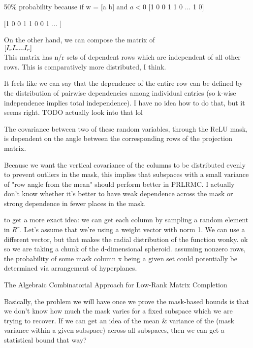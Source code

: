 \documentclass[12pt]{article}
\begin{document}
50\% probability because if w = [a b] and $a<0$
[1 0
0 1
1 0 
...
1 0]


[1 0
0 1
1 0
0 1
...
]

On the other hand, we can compose the matrix of \\$[I_r\\I_r\\...\\I_r]$\\This matrix has n/r sets of dependent rows which are independent of all other rows. This is comparatively more distributed, I think.


It feels like we can say that the dependence of the entire row can be defined by the distribution of pairwise dependencies among individual entries (so k-wise independence implies total independence). I have no idea how to do that, but it seems right. TODO actually look into that lol

The covariance between two of these random variables, through the ReLU mask, is dependent on the angle between the corresponding rows of the projection matrix.

Because we want the vertical covariance of the columns to be distributed evenly to prevent outliers in the mask, this implies that subspaces with a small variance of "row angle from the mean" should perform better in PRLRMC. I actually don't know whether it's better to have weak dependence across the mask or strong dependence in fewer places in the mask.

to get a more exact idea:
we can get each column by sampling a random element in $R^r$. Let's assume that we're using a weight vector with norm 1. We can use a different vector, but that makes the radial distribution of the function wonky.
ok so we are taking a chunk of the d-dimensional spheroid. 
assuming nonzero rows, the probability of some mask column x being a given set could potentially be determined via arrangement of hyperplanes.


The Algebraic Combinatorial Approach for Low-Rank
Matrix Completion




Basically, the problem we will have once we prove the mask-based bounds is that we don't know how much the mask varies for a fixed subspace which we are trying to recover. If we can get an idea of the mean \& variance of the (mask variance within a given subspace) across all subspaces, then we can get a statistical bound that way? 
\end{document}
